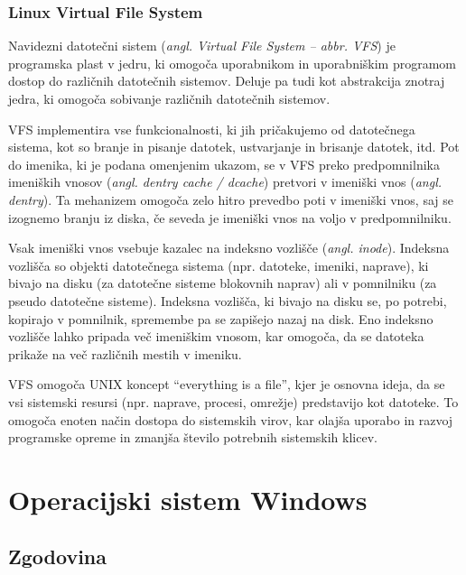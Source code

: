 \documentclass[a4paper,12pt,openright]{book}
\begin{document}
\subsubsection{Linux Virtual File System} \label{ssec:linux:vfs}

Navidezni datotečni sistem (\textit{angl. Virtual File System -- abbr. VFS}) je programska plast v jedru, ki omogoča uporabnikom in uporabniškim programom dostop do različnih datotečnih sistemov.
Deluje pa tudi kot abstrakcija znotraj jedra, ki omogoča sobivanje različnih datotečnih sistemov.

VFS implementira vse funkcionalnosti, ki jih pričakujemo od datotečnega sistema, kot so branje in pisanje datotek, ustvarjanje in brisanje datotek, itd.
Pot do imenika, ki je podana omenjenim ukazom, se v VFS preko predpomnilnika imeniških vnosov (\textit{angl. dentry cache / dcache}) pretvori v imeniški vnos (\textit{angl. dentry}).
Ta mehanizem omogoča zelo hitro prevedbo poti v imeniški vnos, saj se izognemo branju iz diska, če seveda je imeniški vnos na voljo v predpomnilniku.

Vsak imeniški vnos vsebuje kazalec na indeksno vozlišče (\textit{angl. inode}). Indeksna vozlišča so objekti datotečnega sistema (npr. datoteke, imeniki, naprave), ki bivajo na disku (za datotečne sisteme blokovnih naprav) ali v pomnilniku (za pseudo datotečne sisteme).
Indeksna vozlišča, ki bivajo na disku se, po potrebi, kopirajo v pomnilnik, spremembe pa se zapišejo nazaj na disk.
Eno indeksno vozlišče lahko pripada več imeniškim vnosom, kar omogoča, da se datoteka prikaže na več različnih mestih v imeniku.
\cite{Linux_kernel_docs_LVFS}

VFS omogoča UNIX koncept ``everything is a file'', kjer je osnovna ideja, da se vsi sistemski resursi (npr. naprave, procesi, omrežje) predstavijo kot datoteke.
To omogoča enoten način dostopa do sistemskih virov, kar olajša uporabo in razvoj programske opreme in zmanjša število potrebnih sistemskih klicev.

\section{Operacijski sistem Windows}

\subsection{Zgodovina}
\end{document}

